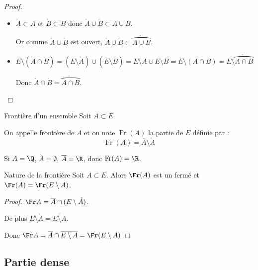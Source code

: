 \begin{proof}
\begin{itemize}
        Donc $\overline {A \cap B} \subset \overline A \cap \overline B$.

        \item $\mathring A \subset A$ et $\mathring B \subset B$ donc $\mathring A \cup \mathring B \subset A \cup B$.

        Or comme $\mathring A \cup \mathring B$ est ouvert, $\mathring A \cup \mathring B \subset \mathring{\overparen{A \cup B}}$.
        
        \item
        $E \setminus (\mathring A \cap \mathring B) = (E \setminus \mathring A) \cup (E \setminus \mathring B) = \overline{E \setminus A} \cup \overline{E \setminus B} = \overline{E \setminus (A \cap B)} = E \setminus \mathring{\overparen{A \cap B}}$

        Donc $\mathring A \cap \mathring B = \mathring{\overparen{A \cap B}}$.
    \end{itemize}
\end{proof}

\begin{definition}{Frontière d'un ensemble}{}
    Soit $A \subset E$. 

    On appelle frontière de $A$ et on note $\operatorname{Fr}(A)$ la partie de $E$ définie 
    par :
    $$ \operatorname{Fr}(A) = \overline A \setminus \mathring A$$
\end{definition}

\begin{exemple}
    Si $A = \Q$, 
    $\mathring A = \emptyset$, $\overline A = \R$, donc $\operatorname{Fr}(A) = \R$.
\end{exemple}


\begin{proposition}{Nature de la frontière}{}
    Soit $A \subset E$. Alors $\Fr(A)$ est un fermé et $\Fr(A) = \Fr(E \setminus A)$.
\end{proposition}

\begin{proof}
    $\Fr A = \overline A \cap (E \setminus \mathring A)$. 

    De plus $E \setminus \mathring A = \overline{E \setminus A}$.

    Donc $\Fr A = \overline A \cap \overline{E \setminus A} = \Fr (E \setminus A)$ 
\end{proof}

\subsection{Partie dense}

